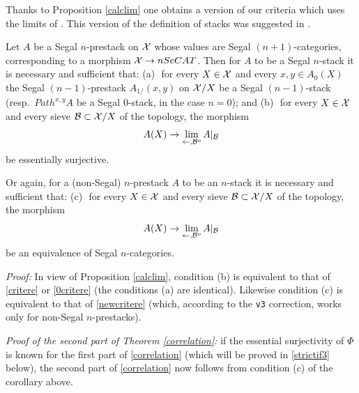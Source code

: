 Thanks to Proposition \ref{calclim} one obtains a version of our criteria
which uses the limits of \cite{limits}. This version of the definition of
stacks was suggested in \cite{limits}.

\begin{corollary}
\label{critereaveclim}
Let $A$ be a Segal $n$-prestack on ${\cal X}$ whose values are Segal
$(n+1)$-categories, corresponding to a morphism ${\cal X} \rightarrow nSeCAT$.
Then for $A$ to be a Segal $n$-stack it is necessary and sufficient that:
\newline
(a)\,\, for every $X\in {\cal X}$ and every $x,y\in A_0(X)$ the Segal
$(n-1)$-prestack $A_{1/}(x,y)$ on ${\cal X} /X$ be a Segal $(n-1)$-stack
(resp.\ $Path^{x,y}A$ be a Segal $0$-stack, in the case $n=0$); and
\newline
(b)\,\, for every $X\in {\cal X}$ and every sieve ${\cal B} \subset {\cal X} /X$ of the
topology, the morphism
$$
A(X)\rightarrow \lim _{\leftarrow , {\cal B} ^o} A|_{{\cal B}}
$$
be essentially surjective.

Or again, for a (non-Segal) $n$-prestack $A$ to be an $n$-stack it is
necessary and sufficient that:
\newline
(c)\,\, for every $X\in {\cal X}$ and every sieve ${\cal B} \subset {\cal X} /X$ of the
topology, the morphism
$$
A(X)\rightarrow \lim _{\leftarrow , {\cal B} ^o} A|_{{\cal B}}
$$
be an equivalence of Segal $n$-categories.
\end{corollary}
{\em Proof:}
In view of Proposition \ref{calclim}, condition (b) is equivalent to that of
\ref{critere} or \ref{0critere} (the conditions (a) are identical). Likewise
condition (c) is equivalent to that of \ref{newcritere} (which, according to
the {\tt v3} correction, works only for non-Segal $n$-prestacks).
\eop

{\em Proof of the second part of Theorem \ref{correlation}:} if the essential
surjectivity of $\Phi$ is known for the first part of \ref{correlation} (which
will be proved in \ref{strictif3} below), the second part of \ref{correlation}
now follows from condition (c) of the corollary above.

\bigskip
